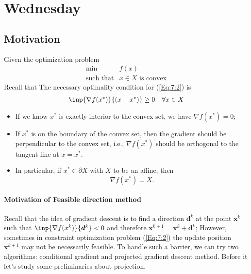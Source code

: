 
\section{Wednesday}
\subsection{Motivation}
Given the optimization problem
\begin{equation}\label{Eq:7:2}
\begin{array}{ll}
\min&f(x)\\
\mbox{such that}&x\in X\mbox{ is convex}
\end{array}
\end{equation}
Recall that The necessary optimality condition for (\ref{Eq:7:2}) is
\[
\begin{array}{ll}
\inp{\nabla f(x^*)}{(x-x^*)}\ge0
&
\forall x\in X
\end{array}
\]
\begin{remark}
\begin{itemize}
\item
If we know $x^*$ is exactly interior to the convex set, we have $\nabla f(x^*)=0$;
\item
If $x^*$ is on the boundary of the convex set, then the gradient should be perpendicular to the convex set, i.e., $\nabla f(x^*)$ should be orthogonal to the tangent line at $x=x^*$. 
\item
In particular, if $x^*\in\partial X$ with $X$ to be an affine, then 
\[
\nabla f(x^*)\perp X.
\]
\end{itemize}
\end{remark}
\paragraph{Motivation of Feasible direction method}Recall that the idea of gradient descent is to find a direction $\bm d^k$ at the point $\bm x^k$ such that $\inp{\nabla f(x^k)}{\bm d^k}<0$ and therefore $\bm x^{k+1}=\bm x^k+\bm d^k$; However, sometimes in constraint optimization problem (\ref{Eq:7:2}) the update position $\bm x^{k+1}$ may not be necessarily feasible. To handle such a barrier, we can try two algorithms: conditional gradient and projected gradient descent method. Before it let's study some preliminaries about projection. 
